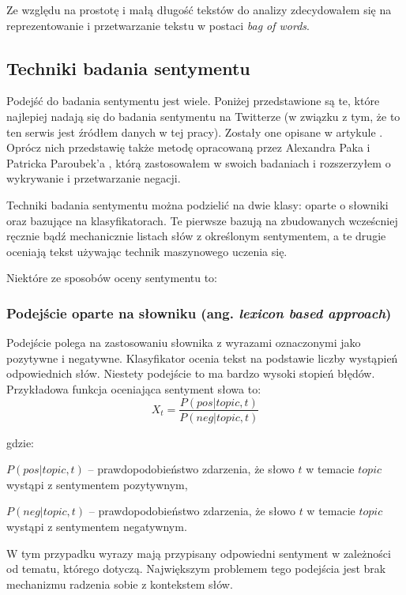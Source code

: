 Ze względu na prostotę i małą długość tekstów do analizy zdecydowałem się
na reprezentowanie i przetwarzanie tekstu w postaci \textit{bag of words}.


\subsection{Techniki badania sentymentu}
Podejść do badania sentymentu jest wiele. Poniżej przedstawione są te, które
najlepiej nadają się do badania sentymentu na Twitterze (w związku z tym, że to
ten serwis jest źródłem danych w tej pracy). Zostały one opisane w artykule 
\cite{sentimentTechniques}. Oprócz nich przedstawię także metodę opracowaną
przez Alexandra Paka i Patricka Paroubek'a \cite{pakParoubekSentiment}, którą 
zastosowałem w swoich badaniach i rozszerzyłem o wykrywanie i przetwarzanie 
negacji. 

Techniki badania sentymentu można podzielić na dwie klasy: oparte o słowniki
oraz bazujące na klasyfikatorach. Te pierwsze bazują na zbudowanych wcześcniej
ręcznie bądź mechanicznie listach słów z określonym sentymentem,
a te drugie oceniają tekst używając technik maszynowego uczenia się.

Niektóre ze sposobów oceny sentymentu to:

\subsubsection{Podejście oparte na słowniku (ang. \textit{lexicon based approach})}
Podejście polega na zastosowaniu słownika z wyrazami oznaczonymi jako pozytywne
i negatywne. Klasyfikator ocenia tekst na podstawie liczby wystąpień
odpowiednich słów. Niestety podejście to ma bardzo wysoki stopień błędów.
Przykładowa funkcja oceniająca sentyment słowa to:
\begin{equation}
X_t = \frac{P(pos | topic, t)}{P(neg | topic, t)}
\end{equation}

gdzie:

$P(pos | topic, t)$ -- prawdopodobieństwo zdarzenia, że słowo $t$ w temacie 
$topic$ wystąpi z sentymentem pozytywnym,

$P(neg | topic, t)$ -- prawdopodobieństwo zdarzenia, że słowo $t$ w temacie
$topic$ wystąpi z sentymentem negatywnym.

\bigskip


W tym przypadku wyrazy mają przypisany odpowiedni sentyment w zależności od
tematu, którego dotyczą. Największym problemem tego podejścia jest brak
mechanizmu radzenia sobie z kontekstem słów.

